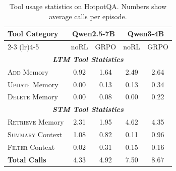 \begin{table}[t]
\centering
\small
\caption{Tool usage statistics on HotpotQA. Numbers show average calls per episode.}
\label{tab:tool_usage}
\begin{tabular}{@{}l|cc|cc@{}}
\toprule
\multirow{2}{*}{\textbf{Tool Category}} & \multicolumn{2}{c|}{\textbf{Qwen2.5-7B}} & \multicolumn{2}{c}{\textbf{Qwen3-4B}} \\
\cmidrule(lr){2-3} \cmidrule(lr){4-5}
 & noRL & GRPO & noRL & GRPO \\
\midrule
\multicolumn{5}{c}{\textbf{\emph{LTM Tool Statistics}}} \\
\midrule
\textsc{Add} Memory & 0.92 & 1.64 & 2.49 & 2.64 \\
\textsc{Update} Memory & 0.00 & 0.13 & 0.13 & 0.34 \\
\textsc{Delete} Memory & 0.00 & 0.08 & 0.00 & 0.22 \\
\midrule
\multicolumn{5}{c}{\textbf{\emph{STM Tool Statistics}}} \\
\midrule
\textsc{Retrieve} Memory & 2.31 & 1.95 & 4.62 & 4.35 \\
\textsc{Summary} Context & 1.08 & 0.82 & 0.11 & 0.96 \\
\textsc{Filter} Context & 0.02 & 0.31 & 0.15 & 0.16 \\
\midrule
\textbf{Total Calls} & 4.33 & 4.92 & 7.50 & 8.67 \\
\bottomrule
\end{tabular}%
\vspace{-0.3cm}
\end{table}

